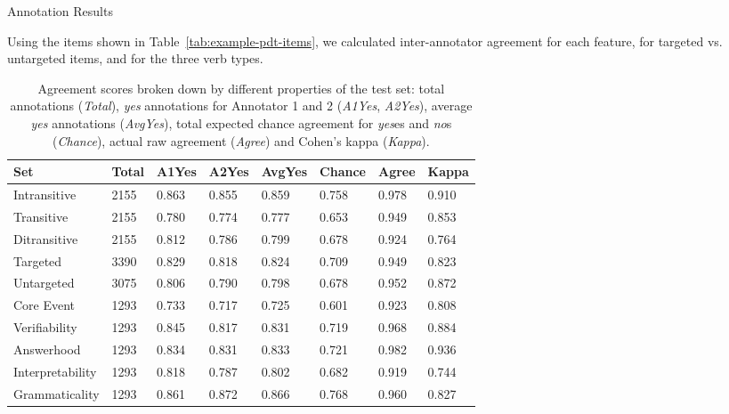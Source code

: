 \documentclass[final,t]{beamer}
\begin{document}
\begin{frame}{}
\begin{columns}[t]
\begin{column}{.33\linewidth}
\begin{block}{Annotation Results}
\begin{center}
\begin{minipage}{.85\textwidth}
\vspace{1em}
Using the items shown in Table~\ref{tab:example-pdt-items}, we calculated inter-annotator agreement for each feature, for targeted vs. untargeted items, and for the three verb types.
\vspace{1em}
\begin{table}[htb!]
\begin{center}
\begin{tabular}{|l|l|l|l|l||l|l||l|}
\hline
Set	& Total	& A1Yes & A2Yes & AvgYes & Chance & Agree & Kappa \\
\hline
\hline
Intransitive & 2155 & 0.863 & 0.855 & 0.859 & 0.758 & 0.978 & 0.910 \\
\hline
Transitive & 2155 & 0.780 & 0.774 & 0.777 & 0.653 & 0.949 & 0.853 \\
\hline
Ditransitive & 2155 & 0.812 & 0.786 & 0.799 & 0.678 & 0.924 & 0.764 \\ 
\hline
\hline
Targeted & 3390 & 0.829 & 0.818 & 0.824 & 0.709 & 0.949 & 0.823 \\
\hline
Untargeted & 3075 & 0.806 & 0.790 & 0.798 & 0.678 & 0.952 & 0.872 \\
\hline
\hline
Core Event & 1293 & 0.733 & 0.717 & 0.725 & 0.601 & 0.923 & 0.808 \\
\hline
Verifiability & 1293 & 0.845 & 0.817 & 0.831 & 0.719 & 0.968 & 0.884 \\
\hline
Answerhood & 1293 & 0.834 & 0.831 & 0.833 & 0.721 & 0.982 & 0.936 \\
\hline
Interpretability & 1293 & 0.818 & 0.787 & 0.802 & 0.682 & 0.919 & 0.744 \\
\hline
Grammaticality & 1293 & 0.861 & 0.872 & 0.866 & 0.768 & 0.960 & 0.827 \\
\hline
\end{tabular}
\caption{\label{tab:agreement} Agreement scores broken down by different properties of the test set: total annotations (\textit{Total}), \textit{yes} annotations for Annotator 1 and 2 (\textit{A1Yes}, \textit{A2Yes}), average \textit{yes} annotations (\textit{AvgYes}), total expected chance agreement for \textit{yes}es and \textit{no}s (\textit{Chance}), actual raw agreement (\textit{Agree}) and Cohen's kappa (\textit{Kappa}).}
\end{center}
\end{table}
\vspace{1em}


\end{minipage}
\end{center}
\end{block}
\end{column}
\end{columns}
\end{frame}
\end{document}
